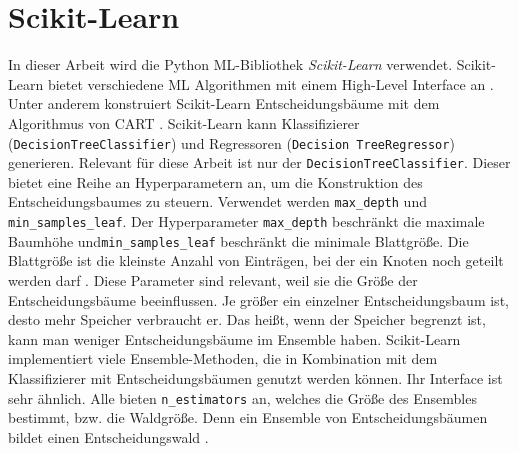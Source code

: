 \section{Scikit-Learn}
In dieser Arbeit wird die Python ML-Bibliothek \textit{Scikit-Learn} verwendet. Scikit-Learn bietet verschiedene ML Algorithmen mit einem High-Level Interface an \cite{scikit-learn}. Unter anderem konstruiert Scikit-Learn
Entscheidungsbäume mit dem Algorithmus von CART \cite{ScikitLearnCART}. Scikit-Learn kann Klassifizierer (\texttt{DecisionTreeClassifier}) und Regressoren (\texttt{Decision TreeRegressor}) generieren.
\newline
\newline
Relevant für diese Arbeit ist nur der \texttt{DecisionTreeClassifier}. Dieser bietet eine Reihe an Hyperparametern an, um die Konstruktion des Entscheidungsbaumes zu steuern. Verwendet werden \texttt{max\_depth}
und \texttt{min\_samples\_leaf}. Der Hyperparameter \texttt{max\_depth} beschränkt die maximale Baumhöhe und\texttt{min\_samples\_leaf} beschränkt die minimale Blattgröße.
Die Blattgröße ist die kleinste Anzahl von Einträgen, bei der ein Knoten noch geteilt werden darf \cite{ScikitLearnDTC}.
Diese Parameter sind relevant, weil sie die Größe der Entscheidungsbäume beeinflussen. Je größer ein einzelner Entscheidungsbaum ist, desto mehr Speicher
verbraucht er. Das heißt, wenn der Speicher begrenzt ist, kann man weniger Entscheidungsbäume im Ensemble haben.
\newline
\newline
Scikit-Learn implementiert viele Ensemble-Methoden, die in Kombination mit dem Klassifizierer mit Entscheidungsbäumen genutzt werden können. Ihr Interface ist sehr ähnlich.
Alle bieten \texttt{n\_estimators} an, welches die Größe des Ensembles bestimmt, bzw. die Waldgröße. Denn ein Ensemble von Entscheidungsbäumen bildet einen Entscheidungswald \cite{ScikitLearnEnsemble}.